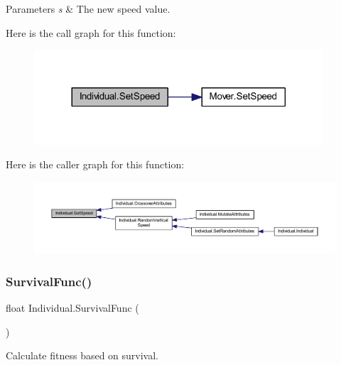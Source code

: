 \begin{DoxyParams}{Parameters}
{\em s} & The new speed value.\\
\hline
\end{DoxyParams}
Here is the call graph for this function\+:\nopagebreak
\begin{figure}[H]
\begin{center}
\leavevmode
\includegraphics[width=305pt]{class_individual_a106bf8917e8f55075f01e39e9c7e2264_cgraph}
\end{center}
\end{figure}
Here is the caller graph for this function\+:\nopagebreak
\begin{figure}[H]
\begin{center}
\leavevmode
\includegraphics[width=350pt]{class_individual_a106bf8917e8f55075f01e39e9c7e2264_icgraph}
\end{center}
\end{figure}
\mbox{\label{class_individual_abf304201269d32a0f40d9a25ce98d8db}} 
\subsubsection{\texorpdfstring{Survival\+Func()}{SurvivalFunc()}}
{\footnotesize\ttfamily float Individual.\+Survival\+Func (\begin{DoxyParamCaption}{ }\end{DoxyParamCaption})}



Calculate fitness based on survival. 

